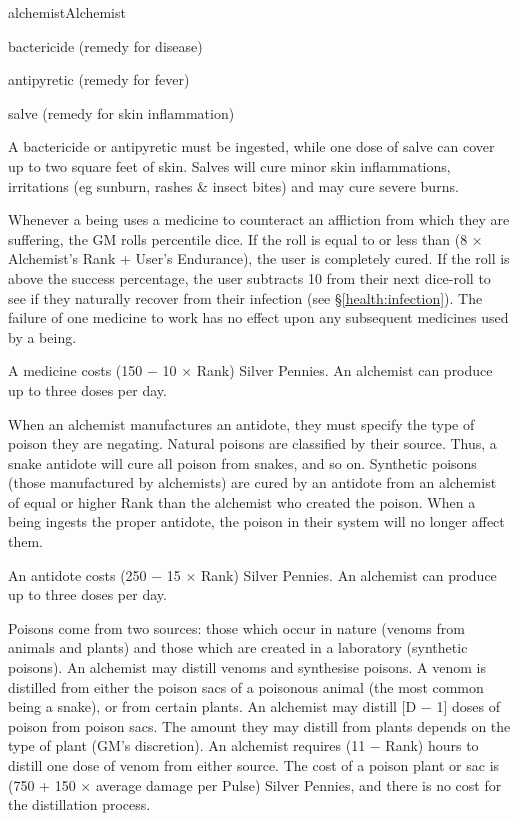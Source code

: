\begin{Skill}[1.1]{alchemist}{Alchemist}
\begin{Itemize}

\item bactericide (remedy for disease)  

\item antipyretic (remedy for fever)  

\item salve (remedy for skin inflammation) 

\end{Itemize}

A bactericide or antipyretic must be ingested, while one dose of salve
can cover up to two square feet of skin. Salves will cure minor skin
inflammations, irritations (eg sunburn, rashes \& insect bites) and
may cure severe burns.

Whenever a being uses a medicine to counteract an affliction from
which they are suffering, the GM rolls percentile dice.  If the roll
is equal to or less than (8 × Alchemist’s Rank + User’s Endurance),
the user is completely cured. If the roll is above the success
percentage, the user subtracts 10 from their next dice-roll to see if
they naturally recover from their infection (see
\S\ref{health:infection}).  The failure of one medicine to work has no
effect upon any subsequent medicines used by a being.

A medicine costs (150 − 10 × Rank) Silver Pennies.  An alchemist can
produce up to three doses per day.

When an alchemist manufactures an antidote, they must specify the type
of poison they are negating.  Natural poisons are classified by their
source.  Thus, a snake antidote will cure all poison from snakes, and
so on. Synthetic poisons (those manufactured by alchemists) are cured
by an antidote from an alchemist of equal or higher Rank than the
alchemist who created the poison.  When a being ingests the proper
antidote, the poison in their system will no longer affect them.

An antidote costs (250 − 15 × Rank) Silver Pennies.  An alchemist can
produce up to three doses per day.


Poisons come from two sources: those which occur in nature (venoms
from animals and plants) and those which are created in a laboratory
(synthetic poisons).  An alchemist may distill venoms and synthesise
poisons.  A venom is distilled from either the poison sacs of a
poisonous animal (the most common being a snake), or from certain
plants.  An alchemist may distill [D − 1] doses of poison from poison
sacs.  The amount they may distill from plants depends on the type of
plant (GM’s discretion).  An alchemist requires (11 − Rank) hours to
distill one dose of venom from either source.  The cost of a poison
plant or sac is (750 + 150 × average damage per Pulse) Silver Pennies,
and there is no cost for the distillation process.


\end{Skill}
